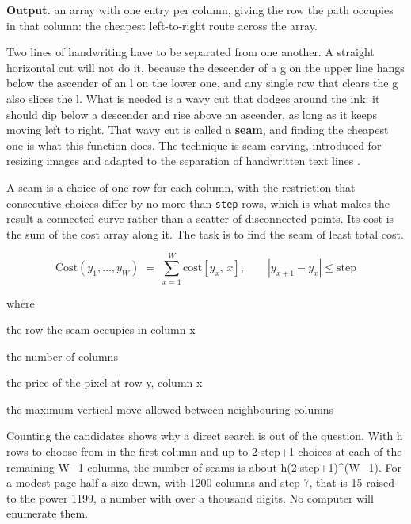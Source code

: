 \noindent\textbf{Output.} an array with one entry per column, giving the row the path occupies in that column: the cheapest left-to-right route across the array.


Two lines of handwriting have to be separated from one another. A straight horizontal cut will not do it, because the descender of a g on the upper line hangs below the ascender of an l on the lower one, and any single row that clears the g also slices the l. What is needed is a wavy cut that dodges around the ink: it should dip below a descender and rise above an ascender, as long as it keeps moving left to right. That wavy cut is called a \textbf{seam}, and finding the cheapest one is what this function does. The technique is seam carving, introduced for resizing images \cite{avidan2007} and adapted to the separation of handwritten text lines \cite{arvanitopoulos2014}.


A seam is a choice of one row for each column, with the restriction that consecutive choices differ by no more than \texttt{step} rows, which is what makes the result a connected curve rather than a scatter of disconnected points. Its cost is the sum of the cost array along it. The task is to find the seam of least total cost.


\begin{equation}
\mathrm{Cost}(y_1,\dots,y_W) \;=\; \sum_{x=1}^{W} \mathrm{cost}[y_x,\,x], \qquad |y_{x+1} - y_{x}| \le \mathrm{step}
\end{equation}

\noindent where
\begin{description}[leftmargin=2.4em,style=nextline,font=\normalfont\ttfamily]\setlength\itemsep{1pt}
  \item[{$y_x$}] \normalfont the row the seam occupies in column x
  \item[{$W$}] \normalfont the number of columns
  \item[{$\mathrm{cost}[y,x]$}] \normalfont the price of the pixel at row y, column x
  \item[{$\mathrm{step}$}] \normalfont the maximum vertical move allowed between neighbouring columns
\end{description}

Counting the candidates shows why a direct search is out of the question. With h rows to choose from in the first column and up to 2$\cdot$step+1 choices at each of the remaining W$-$1 columns, the number of seams is about h(2$\cdot$step+1)\textasciicircum{}(W$-$1). For a modest page half a size down, with 1200 columns and step 7, that is 15 raised to the power 1199, a number with over a thousand digits. No computer will enumerate them.


